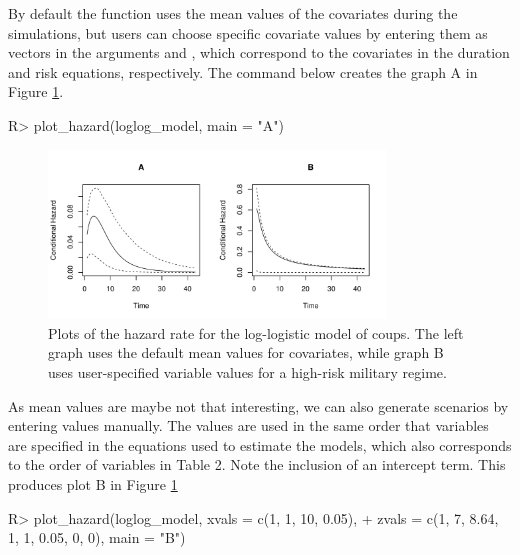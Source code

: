 \documentclass[article]{jss}
\begin{document}
By default the  function
uses the mean values of the covariates during the simulations, but users
can choose specific covariate values by entering them as vectors in the
arguments  and , which correspond to the
covariates in the duration and risk equations, respectively. The command
below creates the graph A in Figure \ref{hazard-ex}.

\begin{CodeChunk}
\begin{CodeInput}
R> plot_hazard(loglog_model, main = "A")
\end{CodeInput}
\end{CodeChunk}

\begin{figure}
\begin{center}
\includegraphics[width=0.8\textwidth]{graphics/hazard-ex.pdf}
\caption{Plots of the hazard rate for the log-logistic model of coups. The left graph uses the default mean values for covariates, while graph B uses user-specified variable values for a high-risk military regime.}
\label{hazard-ex}
\end{center}
\end{figure}

As mean values are maybe not that interesting, we can also generate
scenarios by entering values manually. The values are used in the same
order that variables are specified in the equations used to estimate the
models, which also corresponds to the order of variables in Table 2.
Note the inclusion of an intercept term. This produces plot B in Figure
\ref{hazard-ex}

\begin{CodeChunk}
\begin{CodeInput}
R> plot_hazard(loglog_model, xvals = c(1, 1, 10, 0.05), 
+    zvals = c(1, 7, 8.64, 1, 1, 0.05, 0, 0), main = "B")
\end{CodeInput}
\end{CodeChunk}
\end{document}
